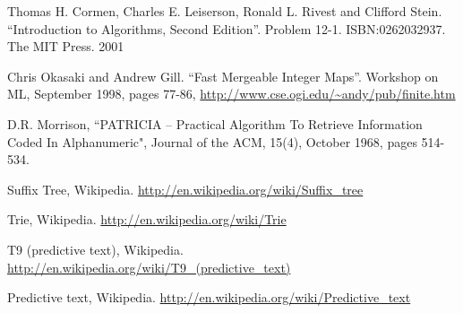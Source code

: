 \documentclass[b5paper]{article}
\begin{document}
\ifx\wholebook\relax \else
\begin{thebibliography}{99}

Thomas H. Cormen, Charles E. Leiserson, Ronald L. Rivest and Clifford Stein.
``Introduction to Algorithms, Second Edition''. Problem 12-1. ISBN:0262032937. The MIT Press. 2001

Chris Okasaki and Andrew Gill. ``Fast Mergeable Integer
Maps''. Workshop on ML, September 1998, pages 77-86, \url{http://www.cse.ogi.edu/~andy/pub/finite.htm}

D.R. Morrison, ``PATRICIA -- Practical Algorithm To Retrieve  Information Coded In Alphanumeric", Journal of the ACM, 15(4), October 1968, pages 514-534.

Suffix Tree, Wikipedia. \url{http://en.wikipedia.org/wiki/Suffix_tree}

Trie, Wikipedia. \url{http://en.wikipedia.org/wiki/Trie}

T9 (predictive text), Wikipedia. \url{http://en.wikipedia.org/wiki/T9_(predictive_text)}

Predictive text,
Wikipedia. \url{http://en.wikipedia.org/wiki/Predictive_text}

\end{thebibliography}

\expandafter\enddocument
\fi
\end{document}
